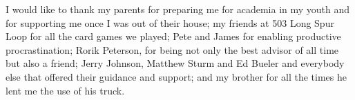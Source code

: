 I would like to thank my parents for preparing me for academia in my youth and
for supporting me once I was out of their house; my friends at 503 Long Spur
Loop for all the card games we played; Pete and James for enabling productive
procrastination; Rorik Peterson, for being not only the best advisor of all time
but also a friend; Jerry Johnson, Matthew Sturm and Ed Bueler and everybody else
that offered their guidance and support; and my brother for all the times he
lent me the use of his truck.
